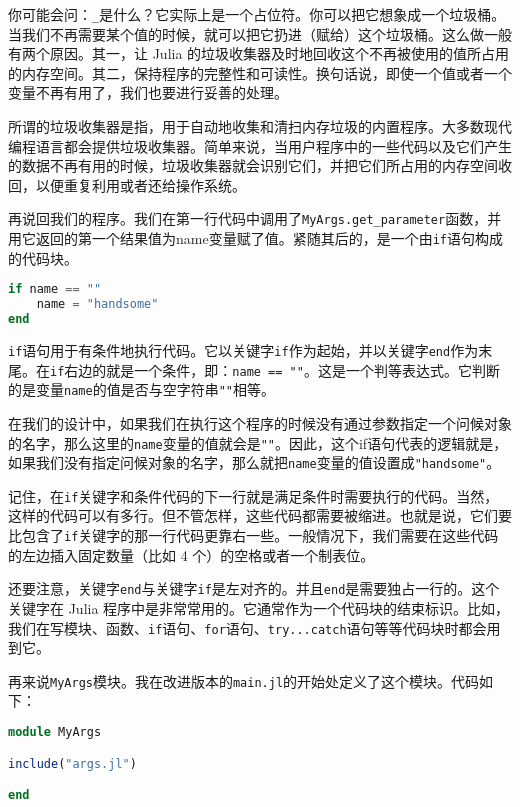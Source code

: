 你可能会问：\verb|_|是什么？它实际上是一个占位符。你可以把它想象成一个垃圾桶。当我们不再需要某个值的时候，就可以把它扔进（赋给）这个垃圾桶。这么做一般有两个原因。其一，让 Julia 的垃圾收集器及时地回收这个不再被使用的值所占用的内存空间。其二，保持程序的完整性和可读性。换句话说，即使一个值或者一个变量不再有用了，我们也要进行妥善的处理。

所谓的垃圾收集器是指，用于自动地收集和清扫内存垃圾的内置程序。大多数现代编程语言都会提供垃圾收集器。简单来说，当用户程序中的一些代码以及它们产生的数据不再有用的时候，垃圾收集器就会识别它们，并把它们所占用的内存空间收回，以便重复利用或者还给操作系统。

再说回我们的程序。我们在第一行代码中调用了\verb|MyArgs.get_parameter|函数，并用它返回的第一个结果值为name变量赋了值。紧随其后的，是一个由\verb|if|语句构成的代码块。

\begin{lstlisting}[language=julia]
if name == "" 
    name = "handsome" 
end
\end{lstlisting}

\verb|if|语句用于有条件地执行代码。它以关键字\verb|if|作为起始，并以关键字\verb|end|作为末尾。在\verb|if|右边的就是一个条件，即：\verb|name == ""|。这是一个判等表达式。它判断的是变量\verb|name|的值是否与空字符串\verb|""|相等。

在我们的设计中，如果我们在执行这个程序的时候没有通过参数指定一个问候对象的名字，那么这里的\verb|name|变量的值就会是\verb|""|。因此，这个if语句代表的逻辑就是，如果我们没有指定问候对象的名字，那么就把\verb|name|变量的值设置成\verb|"handsome"|。

记住，在\verb|if|关键字和条件代码的下一行就是满足条件时需要执行的代码。当然，这样的代码可以有多行。但不管怎样，这些代码都需要被缩进。也就是说，它们要比包含了\verb|if|关键字的那一行代码更靠右一些。一般情况下，我们需要在这些代码的左边插入固定数量（比如 4 个）的空格或者一个制表位。

还要注意，关键字\verb|end|与关键字\verb|if|是左对齐的。并且\verb|end|是需要独占一行的。这个关键字在 Julia 程序中是非常常用的。它通常作为一个代码块的结束标识。比如，我们在写模块、函数、\verb|if|语句、\verb|for|语句、\verb|try...catch|语句等等代码块时都会用到它。

再来说\verb|MyArgs|模块。我在改进版本的\verb|main.jl|的开始处定义了这个模块。代码如下：

\begin{lstlisting}[language=julia]
module MyArgs

include("args.jl")

end
\end{lstlisting}

